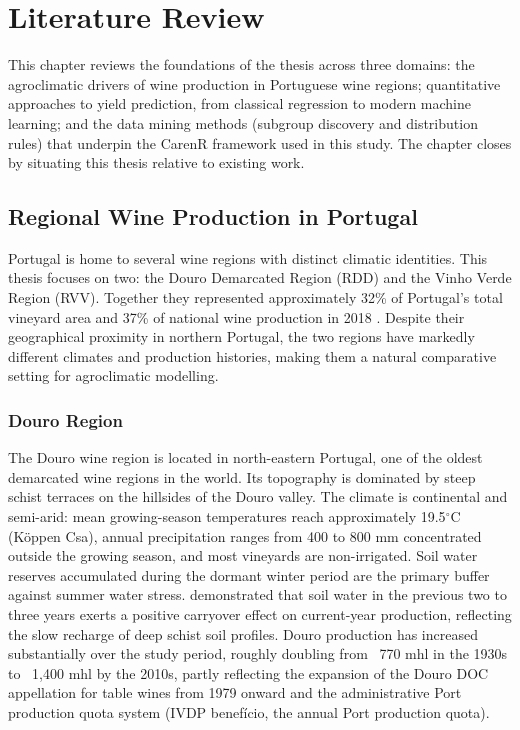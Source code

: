 
\chapter{Literature Review}\label{ch:literature_review}

This chapter reviews the foundations of the thesis across three domains: the agroclimatic drivers of wine production in Portuguese wine regions; quantitative approaches to yield prediction, from classical regression to modern machine learning; and the data mining methods (subgroup discovery and distribution rules) that underpin the CarenR framework used in this study. The chapter closes by situating this thesis relative to existing work.


\section{Regional Wine Production in Portugal}\label{sec:regional_wine_production_in}

Portugal is home to several wine regions with distinct climatic identities. This thesis focuses on two: the Douro Demarcated Region (RDD) and the Vinho Verde Region (RVV). Together they represented approximately 32\% of Portugal's total vineyard area and 37\% of national wine production in 2018 \citep{Cunha2020}. Despite their geographical proximity in northern Portugal, the two regions have markedly different climates and production histories, making them a natural comparative setting for agroclimatic modelling.


\subsection{Douro Region}\label{sub:douro_region}

The Douro wine region is located in north-eastern Portugal, one of the oldest demarcated wine regions in the world. Its topography is dominated by steep schist terraces on the hillsides of the Douro valley. The climate is continental and semi-arid: mean growing-season temperatures reach approximately 19.5$^\circ$C (Köppen Csa), annual precipitation ranges from 400 to 800 mm concentrated outside the growing season, and most vineyards are non-irrigated. Soil water reserves accumulated during the dormant winter period are the primary buffer against summer water stress. \citet{Cunha2016} demonstrated that soil water in the previous two to three years exerts a positive carryover effect on current-year production, reflecting the slow recharge of deep schist soil profiles. Douro production has increased substantially over the study period, roughly doubling from ~770 mhl in the 1930s to ~1,400 mhl by the 2010s, partly reflecting the expansion of the Douro DOC appellation for table wines from 1979 onward and the administrative Port production quota system (IVDP benef\'icio, the annual Port production quota).


